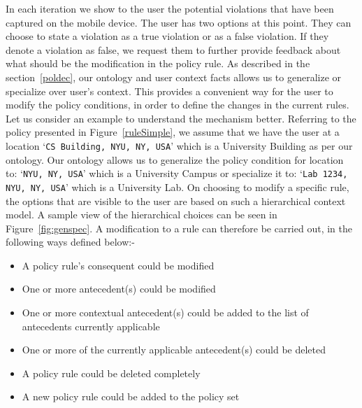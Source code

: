 In each iteration we show to the user the potential violations that have been captured on the mobile device. The user has two options at this point. They can choose to state a violation as a true violation or as a false violation. If they denote a violation as false, we request them to further provide feedback about what should be the modification in the policy rule. As described in the section~\ref{poldec}, our ontology and user context facts allows us to generalize or specialize over user's context. This provides a convenient way for the user to modify the policy conditions, in order to define the changes in the current rules. Let us consider an example to understand the mechanism better. Referring to the policy presented in Figure~\ref{ruleSimple}, we assume that we have the user at a location `\texttt{CS Building, NYU, NY, USA}' which is a University Building as per our ontology. Our ontology allows us to generalize the policy condition for location to: `\texttt{NYU, NY, USA}' which is a University Campus or specialize it to: `\texttt{Lab 1234, NYU, NY, USA}' which is a University Lab. On choosing to modify a specific rule, the options that are visible to the user are based on such a hierarchical context model. A sample view of the hierarchical choices can be seen in Figure~\ref{fig:genspec}. A modification to a rule can therefore be carried out, in the following ways defined below:-
\begin{itemize}
	\item A policy rule's consequent could be modified
	\item One or more antecedent(s) could be modified
	\item One or more contextual antecedent(s) could be added to the list of antecedents currently applicable
	\item One or more of the currently applicable antecedent(s) could be deleted
	\item A policy rule could be deleted completely
	\item A new policy rule could be added to the policy set
\end{itemize}
